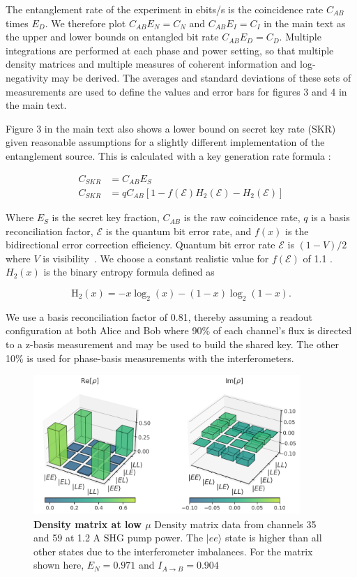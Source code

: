 \documentclass[11pt]{caltech_thesis} %
\begin{document}
The entanglement rate of the experiment in ebits/s is the coincidence rate $C_{AB}$ times $E_D$. We therefore plot $C_{AB}E_N = C_N$ and $C_{AB}E_I = C_I$ in the main text as the upper and lower bounds on entangled bit rate $C_{AB}E_D = C_D$. Multiple integrations are performed at each phase and power setting, so that multiple density matrices and multiple measures of coherent information and log-negativity may be derived. The averages and standard deviations of these sets of measurements are used to define the values and error bars for figures 3 and 4 in the main text.

Figure 3 in the main text also shows a lower bound on secret key rate (SKR) given reasonable assumptions for a slightly different implementation of the entanglement source. This is calculated with a key generation rate formula \autocite{ma2007quantum}:

\begin{align}
C_{SKR} &= C_{AB} E_S \\
C_{SKR} &= q C_{AB}[1-f(\mathcal{E}) H_2(\mathcal{E})-H_2(\mathcal{E})]
\end{align}

Where $E_S$ is the secret key fraction, $C_{AB}$ is the raw coincidence rate, $q$ is a basis reconciliation factor, $\mathcal{E}$ is the quantum bit error rate, and $f(x)$ is the bidirectional error correction efficiency. Quantum bit error rate $\mathcal{E}$ is $(1-V)/2$ where $V$ is visibility~\autocite{Kim2022}. We choose a constant realistic value for $f(\mathcal{E})$ of 1.1 \autocite{ElkoussReconciliation2010}. $H_2(x)$ is the binary entropy formula defined as

$$\mathrm{H}_2(x)=-x \log _2(x)-(1-x) \log _2(1-x).$$

We use a basis reconciliation factor of 0.81, thereby assuming a readout configuration at both Alice and Bob where 90\% of each channel's flux is directed to a z-basis measurement and may be used to build the shared key. The other 10\% is used for phase-basis measurements with the interferometers.

\hypertarget{fig:density_matrix}{%
\begin{figure}
\centering
\includegraphics[width=0.9\textwidth,height=\textheight]{./chapter_05/figs/density_matrix_light.pdf}
\caption[{Density matrix at low \(\mu\)}]{\textbf{Density matrix at low $\mu$} Density matrix data from channels 35 and 59 at 1.2 A SHG pump power. The $|ee\rangle$ state is higher than all other states due to the interferometer imbalances. For the matrix shown here, $E_N = 0.971$ and $I_{A\rightarrow B} = 0.904$}
\label{fig:density_matrix}
\end{figure}
}
\end{document}
